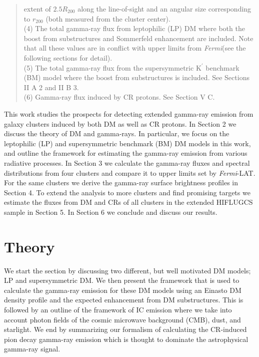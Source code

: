\documentclass[10pt,aps,pra,reprint,amsmath,amsfonts,amssymb,showpacs,nofootinbib,floatfix]{revtex4-1}
\newcommand{\Fermi}{{\em Fermi}\xspace}
\newcommand{\rmn}{\mathrm}
\newcommand{\Kp}{\rmn{K}^\prime}
\newcommand{\rvir}{r_{200}}
\begin{document}
\begin{table}
\begin{minipage}{2.0\columnwidth}
\begin{quote}
  extent of $2.5 R_{200}$ along the line-of-sight and an angular size
  corresponding to $\rvir$  (both measured from the cluster center).\\
  (4) The total gamma-ray flux from leptophilic (LP) DM where both the
  boost from substructures and Sommerfeld enhancement are
  included. Note that all these values are in conflict with upper limits from
  \Fermi (see the following sections for detail).\\
  (5) The total gamma-ray flux from the supersymmetric $\Kp$ benchmark (BM) 
  model where the boost from substructures is included. See Sections II A 2 and II B 3.\\
  (6) Gamma-ray flux induced by CR protons. See Section V C. 
 \label{tab:flux_tab}
  \end{quote}
\end{minipage}
\end{table} 

This work studies the prospects for detecting extended gamma-ray
emission from galaxy clusters induced by both DM as well as CR
protons. In Section 2 we discuss the theory of DM and gamma-rays. In
particular, we focus on the leptophilic (LP) and supersymmetric
benchmark (BM) DM models in this work, and outline the framework
for estimating the gamma-ray emission from various radiative
processes. In Section 3 we calculate the gamma-ray fluxes and spectral
distributions from four clusters and compare it to upper limits set by
\Fermi-LAT. For the same clusters we derive the gamma-ray surface
brightness profiles in Section 4. To extend the analysis to more
clusters and find promising targets we estimate the fluxes from DM and
CRs of all clusters in the extended HIFLUGCS sample in Section 5. In
Section 6 we conclude and discuss our results.

\section{Theory}
\label{sect:theory}
We start the section by discussing two different, but well motivated
DM models; LP and supersymmetric DM. We then present the framework
that is used to calculate the gamma-ray emission for these DM models
using an Einasto DM density profile and the expected enhancement from
DM substructures. This is followed by an outline of the framework of
IC emission where we take into account photon fields of the cosmic
microwave background (CMB), dust, and starlight. We end by summarizing
our formalism of calculating the CR-induced pion decay gamma-ray
emission which is thought to dominate the astrophysical gamma-ray
signal.
\end{document}
